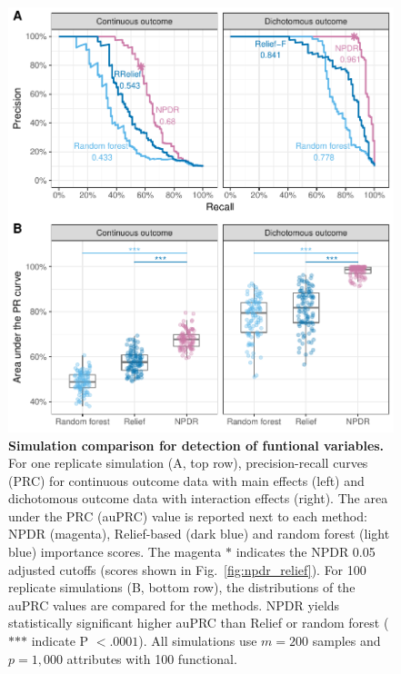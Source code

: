 \documentclass[10pt]{article}
\begin{document}
\begin{figure}[!tbp]
\centerline{\includegraphics[trim = 0 0 0 0]{../figs/fig2_pr_plots.pdf}}
\caption{{\bf Simulation comparison for detection of funtional variables.} For one replicate simulation (A, top row), precision-recall curves (PRC) for continuous outcome data with main effects (left) and dichotomous outcome data with interaction effects (right). The area under the PRC (auPRC) value is reported next to each method: NPDR (magenta), Relief-based (dark blue) and random forest (light blue) importance scores. The magenta $\ast$ indicates the NPDR 0.05 adjusted cutoffs (scores shown in Fig.~\ref{fig:npdr_relief}). For 100 replicate simulations (B, bottom row), the distributions of the auPRC values are compared for the methods. NPDR yields statistically significant higher auPRC than Relief or random forest ($\ast$$\ast$$\ast$ indicate P $<.0001$). All simulations use $m = 200$ samples and $p = 1,000$ attributes with 100 functional.}
\label{fig:pr_curve}
\end{figure}
\end{document}
